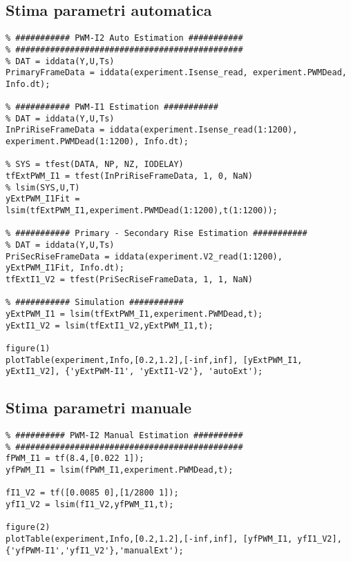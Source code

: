 \subsection{Stima parametri automatica}
\begin{lstlisting}[style=matlabStyle,caption={Stima corrente Primario automatica},label=lst:autoEst] 
% ##############################################
% ########### PWM-I2 Auto Estimation ###########
% ##############################################
% DAT = iddata(Y,U,Ts) 
PrimaryFrameData = iddata(experiment.Isense_read, experiment.PWMDead, Info.dt);

% ########### PWM-I1 Estimation ###########
% DAT = iddata(Y,U,Ts) 
InPriRiseFrameData = iddata(experiment.Isense_read(1:1200), experiment.PWMDead(1:1200), Info.dt);

% SYS = tfest(DATA, NP, NZ, IODELAY)
tfExtPWM_I1 = tfest(InPriRiseFrameData, 1, 0, NaN)
% lsim(SYS,U,T)
yExtPWM_I1Fit = lsim(tfExtPWM_I1,experiment.PWMDead(1:1200),t(1:1200));

% ########### Primary - Secondary Rise Estimation ###########
% DAT = iddata(Y,U,Ts) 
PriSecRiseFrameData = iddata(experiment.V2_read(1:1200), yExtPWM_I1Fit, Info.dt);
tfExtI1_V2 = tfest(PriSecRiseFrameData, 1, 1, NaN)

% ########### Simulation ###########
yExtPWM_I1 = lsim(tfExtPWM_I1,experiment.PWMDead,t);
yExtI1_V2 = lsim(tfExtI1_V2,yExtPWM_I1,t);

figure(1)
plotTable(experiment,Info,[0.2,1.2],[-inf,inf], [yExtPWM_I1, yExtI1_V2], {'yExtPWM-I1', 'yExtI1-V2'}, 'autoExt');
\end{lstlisting}

\subsection{Stima parametri manuale}
\begin{lstlisting}[style=matlabStyle,caption={Stima parametri manuale},label=lst:manualEst] 
% ##############################################
% ########## PWM-I2 Manual Estimation ##########
% ##############################################
fPWM_I1 = tf(8.4,[0.022 1]);
yfPWM_I1 = lsim(fPWM_I1,experiment.PWMDead,t);

fI1_V2 = tf([0.0085 0],[1/2800 1]);
yfI1_V2 = lsim(fI1_V2,yfPWM_I1,t);

figure(2)
plotTable(experiment,Info,[0.2,1.2],[-inf,inf], [yfPWM_I1, yfI1_V2], {'yfPWM-I1','yfI1_V2'},'manualExt');
\end{lstlisting}


